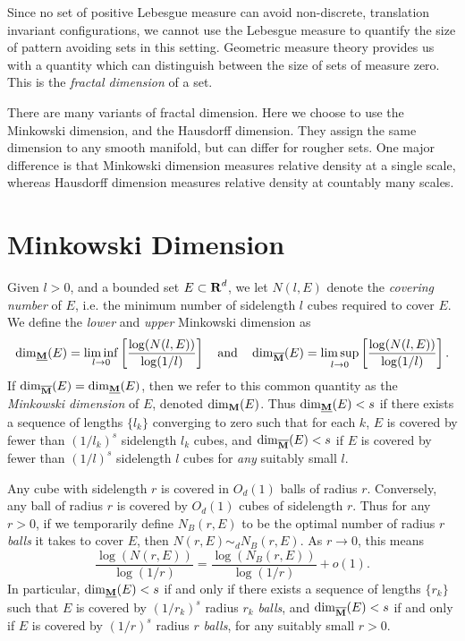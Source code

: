 Since no set of positive Lebesgue measure can avoid non-discrete, translation invariant configurations, we cannot use the Lebesgue measure to quantify the size of pattern avoiding sets in this setting. Geometric measure theory provides us with a quantity which can distinguish between the size of sets of measure zero. This is the \emph{fractal dimension} of a set.

There are many variants of fractal dimension. Here we choose to use the Minkowski dimension, and the Hausdorff dimension. They assign the same dimension to any smooth manifold, but can differ for rougher sets. One major difference is that Minkowski dimension measures relative density at a single scale, whereas Hausdorff dimension measures relative density at countably many scales.









\section{Minkowski Dimension}

Given $l > 0$, and a bounded set $E \subset \operatorname{\mathbf{R}}^d$, we let $N(l,E)$ denote the \emph{covering number} of $E$, i.e. the minimum number of sidelength $l$ cubes required to cover $E$. We define the \emph{lower} and \emph{upper} Minkowski dimension as
%
\[ \operatorname{\dim_{\underline{\mathbf{M}}}}(E) = \liminf_{l \to 0} \left[ \frac{\log(N(l,E))}{\log(1/l)} \right] \quad\text{and}\quad \operatorname{\dim_{\overline{\mathbf{M}}}}(E) = \limsup_{l \to 0} \left[ \frac{\log(N(l,E))}{\log(1/l)} \right]. \]
%
If $\operatorname{\dim_{\overline{\mathbf{M}}}}(E) = \operatorname{\dim_{\underline{\mathbf{M}}}}(E)$, then we refer to this common quantity as the \emph{Minkowski dimension} of $E$, denoted $\operatorname{\dim_{\mathbf{M}}}(E)$. Thus $\operatorname{\dim_{\underline{\mathbf{M}}}}(E) < s$ if there exists a sequence of lengths $\{ l_k \}$ converging to zero such that for each $k$, $E$ is covered by fewer than $(1/l_k)^s$ sidelength $l_k$ cubes, and $\operatorname{\dim_{\overline{\mathbf{M}}}}(E) < s$ if $E$ is covered by fewer than $(1/l)^s$ sidelength $l$ cubes for \emph{any} suitably small $l$.

\begin{remark}
	Any cube with sidelength $r$ is covered in $O_d(1)$ balls of radius $r$. Conversely, any ball of radius $r$ is covered by $O_d(1)$ cubes of sidelength $r$. Thus for any $r > 0$, if we temporarily define $N_B(r,E)$ to be the optimal number of radius $r$ \emph{balls} it takes to cover $E$, then $N(r,E) \sim_d N_B(r,E)$. As $r \to 0$, this means
	\[ \frac{\log(N(r,E))}{\log(1/r)} = \frac{\log(N_B(r,E))}{\log(1/r)} + o(1). \]
	In particular, $\operatorname{\dim_{\underline{\mathbf{M}}}}(E) < s$ if and only if there exists a sequence of lengths $\{ r_k \}$ such that $E$ is covered by $(1/r_k)^s$ radius $r_k$ \emph{balls}, and $\operatorname{\dim_{\overline{\mathbf{M}}}}(E) < s$ if and only if $E$ is covered by $(1/r)^s$ radius $r$ \emph{balls}, for any suitably small $r > 0$.
\end{remark}


